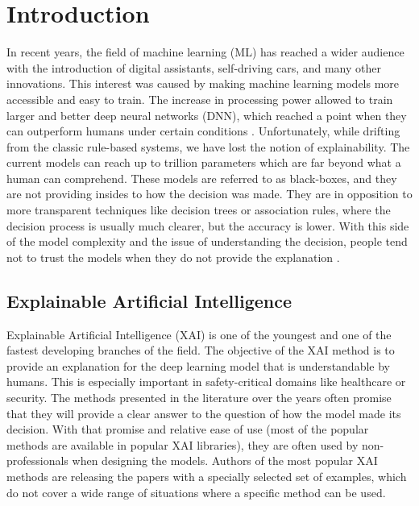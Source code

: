\chapter{Introduction}\label{chapter:intro}
\thispagestyle{chapterBeginStyle}

In recent years, the field of machine learning (ML) has reached a wider audience with the introduction of digital assistants, self-driving cars, and many other innovations. This interest was caused by making machine learning models more accessible and easy to train. The increase in processing power allowed to train larger and better deep neural networks (DNN), which reached a point when they can outperform humans under certain conditions \cite{dodge2017study, sturman2020deep, rank2020deep, wani2020advances}. Unfortunately, while drifting from the classic rule-based systems, we have lost the notion of explainability. The current models can reach up to trillion parameters \cite{fedus2021switch} which are far beyond what a human can comprehend. These models are referred to as black-boxes, and they are not providing insides to how the decision was made. They are in opposition to more transparent techniques like decision trees or association rules, where the decision process is usually much clearer, but the accuracy is lower. With this side of the model complexity and the issue of understanding the decision, people tend not to trust the models when they do not provide the explanation \cite{edwards2017slave}.

\section{Explainable Artificial Intelligence}

Explainable Artificial Intelligence (XAI) is one of the youngest and one of the fastest developing branches of the field. The objective of the XAI method is to provide an explanation for the deep learning model that is understandable by humans. This is especially important in safety-critical domains like healthcare or security. The methods presented in the literature over the years often promise that they will provide a clear answer to the question of how the model made its decision. With that promise and relative ease of use (most of the popular methods are available in popular XAI libraries), they are often used by non-professionals when designing the models. Authors of the most popular XAI methods are releasing the papers with a specially selected set of examples, which do not cover a wide range of situations where a specific method can be used.

